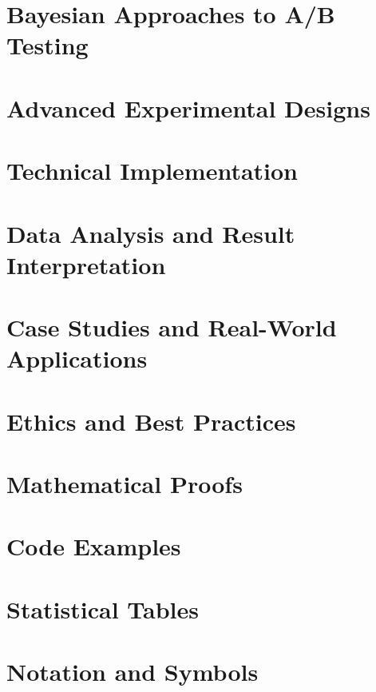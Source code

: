 \documentclass[12pt,a4paper]{book}
\theoremstyle{definition}
\begin{document}
\chapter{Bayesian Approaches to A/B Testing}
\label{ch:bayesian}


\chapter{Advanced Experimental Designs}
\label{ch:advanced_designs}


\chapter{Technical Implementation}


\chapter{Data Analysis and Result Interpretation}


\chapter{Case Studies and Real-World Applications}


\chapter{Ethics and Best Practices}


\backmatter

\appendix
\chapter{Mathematical Proofs}


\chapter{Code Examples}


\chapter{Statistical Tables}


\chapter{Notation and Symbols}





\printindex
\end{document}
